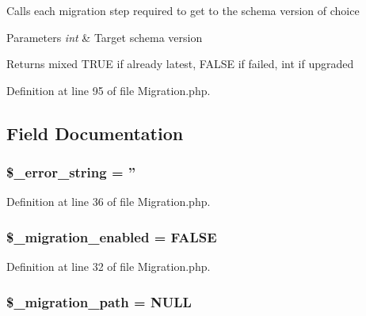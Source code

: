 Calls each migration step required to get to the schema version of choice


\begin{DoxyParams}{Parameters}
{\em int} & Target schema version \\
\hline
\end{DoxyParams}
\begin{DoxyReturn}{Returns}
mixed T\-R\-U\-E if already latest, F\-A\-L\-S\-E if failed, int if upgraded 
\end{DoxyReturn}


Definition at line 95 of file Migration.\-php.



\subsection{Field Documentation}
\hypertarget{class_c_i___migration_a2574ed23c2ed6d71d6e8396f0c4fde0f}{
\subsubsection[{\$\-\_\-error\-\_\-string}]{\setlength{\rightskip}{0pt plus 5cm}\$\-\_\-error\-\_\-string = ''\hspace{0.3cm}{\ttfamily [protected]}}}\label{class_c_i___migration_a2574ed23c2ed6d71d6e8396f0c4fde0f}


Definition at line 36 of file Migration.\-php.

\hypertarget{class_c_i___migration_a4ab2a6819f2d038b7ad2faa0a09161d1}{
\subsubsection[{\$\-\_\-migration\-\_\-enabled}]{\setlength{\rightskip}{0pt plus 5cm}\$\-\_\-migration\-\_\-enabled = F\-A\-L\-S\-E\hspace{0.3cm}{\ttfamily [protected]}}}\label{class_c_i___migration_a4ab2a6819f2d038b7ad2faa0a09161d1}


Definition at line 32 of file Migration.\-php.

\hypertarget{class_c_i___migration_a47cd630e42ae345f6e6ebe4235612a2e}{
\subsubsection[{\$\-\_\-migration\-\_\-path}]{\setlength{\rightskip}{0pt plus 5cm}\$\-\_\-migration\-\_\-path = N\-U\-L\-L\hspace{0.3cm}{\ttfamily [protected]}}}\label{class_c_i___migration_a47cd630e42ae345f6e6ebe4235612a2e}


